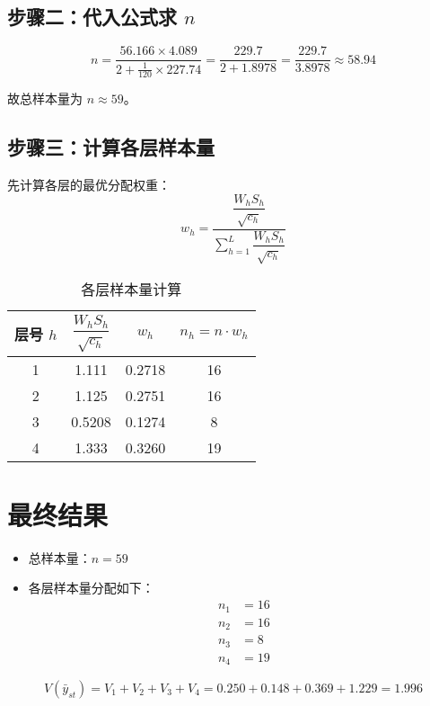 \documentclass[cn,hazy,blue,12pt,normal]{elegantnote}
\begin{document}
\subsection*{步骤二：代入公式求 $n$}

\[
n = \frac{56.166 \times 4.089}{2 + \frac{1}{120} \times 227.74}
= \frac{229.7}{2 + 1.8978} = \frac{229.7}{3.8978} \approx 58.94
\]

故总样本量为 $n \approx 59$。

\subsection*{步骤三：计算各层样本量}

先计算各层的最优分配权重：
\[
w_h = \frac{\dfrac{W_h S_h}{\sqrt{c_h}}}{\sum_{h=1}^L \dfrac{W_h S_h}{\sqrt{c_h}}}
\]

\begin{table}[h!]
\centering
\caption{各层样本量计算}
\begin{tabular}{cccc}
\toprule
层号 $h$ & $\dfrac{W_h S_h}{\sqrt{c_h}}$ & $w_h$ & $n_h = n \cdot w_h$ \\
\midrule
1 & 1.111 & 0.2718 & 16 \\
2 & 1.125 & 0.2751 & 16 \\
3 & 0.5208 & 0.1274 & 8 \\
4 & 1.333 & 0.3260 & 19 \\
\bottomrule
\end{tabular}
\end{table}

\section*{最终结果}

\begin{itemize}
  \item 总样本量：$n = 59$
  \item 各层样本量分配如下：
  \[
  \begin{aligned}
  n_1 &= 16 \\
  n_2 &= 16 \\
  n_3 &= 8 \\
  n_4 &= 19
  \end{aligned}
  \]
\end{itemize}


\begin{equation}
    V(\bar{y}_{st}) = V_1 + V_2 + V_3 + V_4 = 0.250 + 0.148 + 0.369 + 1.229 = \boxed{1.996}
\end{equation}
\end{document}
